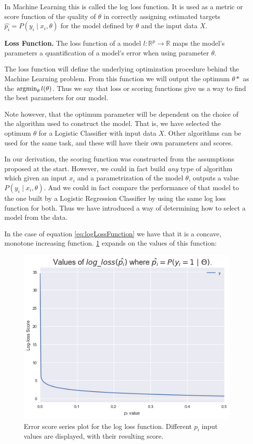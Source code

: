 In Machine Learning this is called the log loss function. It is used as a metric or score function of the quality of $\theta$ in correctly assigning estimated targets $ {\hat{p_i}} = P(y_i \mid x_i,\theta)$ for the model defined by $\theta$ and the input data $X$.


\begin{definition}{\textbf{Loss Function.}}
The loss function of a model $l: \mathbb{R}^{ p} \rightarrow  \mathbb{R} $ maps the model's parameters a quantification of a model's error when using parameter $\theta$.
\end{definition}

The loss function will define the underlying optimization procedure behind the Machine Learning problem. From this function we will output the optimum $\theta*$ as the $\operatorname*{argmin}_{\theta} l(\theta) $. Thus we say that loss or scoring functions give us a way to find the best parameters for our model.

Note however, that the optimum parameter will be dependent on the choice of the algorithm used to construct the model. That is, we have selected the optimum $\theta$ for a Logistic Classifier with input data $X$. Other algorithms can be used for the same task, and these will have their own parameters and scores.

In our derivation, the scoring function was constructed from the assumptions proposed at the start. However, we could in fact build \textit{any} type of algorithm which given an input $x_i$ and a parametrization of the model $\theta$, outputs a value $P(y_i \mid x_i,\theta)$. And we could in fact compare the performance of that model to the one built by a Logistic Regression Classifier by using the same log loss function for both. Thus we have introduced a way of determining how to select a model from the data.

In the case of equation \cref{eq:logLossFunction} we have that it is a concave, monotone increasing function. \cref{figure-logLossValues} expands on the values of this function:

\begin{figure}[h!]
\begin{center}
\includegraphics[width=0.7\columnwidth]{figures/logloss/figure-logLossValues.png}
\caption{ Error score series plot for the log loss function. Different $p_i$ input values are displayed, with their resulting score.}
\label{figure-logLossValues}
\end{center}
\end{figure}


